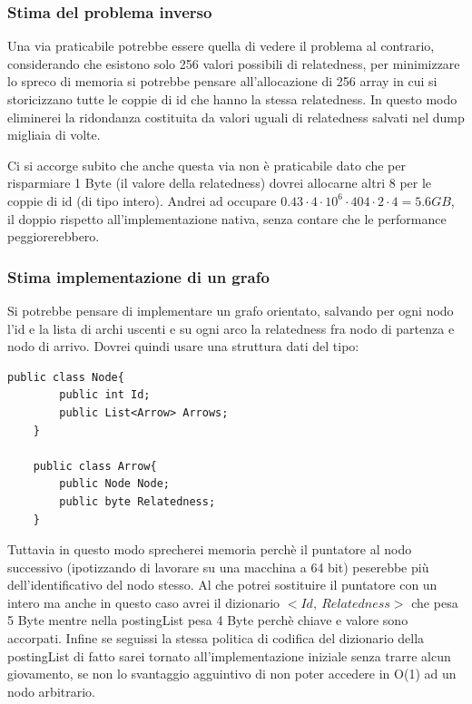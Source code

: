 \subsubsection{Stima del problema inverso}
Una via praticabile potrebbe essere quella di vedere il problema al contrario, considerando che esistono solo 256 valori possibili di relatedness, 
per minimizzare lo spreco di memoria si potrebbe pensare all'allocazione di 256 array in cui si storicizzano tutte le coppie di id che hanno la stessa relatedness. 
In questo modo eliminerei la ridondanza costituita da valori uguali di relatedness salvati nel dump migliaia di volte.

Ci si accorge subito che anche questa via non è praticabile dato che per risparmiare 1 Byte (il valore della relatedness) dovrei allocarne altri 8 per le coppie di id (di tipo intero). 
Andrei ad occupare $0.43 \cdot 4 \cdot 10^6 \cdot 404 \cdot 2 \cdot 4 = 5.6 GB$, il doppio rispetto all'implementazione nativa, senza contare che 
le performance peggiorerebbero.

\subsubsection{Stima implementazione di un grafo}
Si potrebbe pensare di implementare un grafo orientato, salvando per ogni nodo l'id e la lista di archi uscenti e su ogni arco la relatedness fra nodo di partenza 
e nodo di arrivo. Dovrei quindi usare una struttura dati del tipo:
 
\begin{lstlisting}[style=JavaStyle, caption=Struttura di un possibile grafo]
    public class Node{
        public int Id;
        public List<Arrow> Arrows;  
    }

    public class Arrow{
        public Node Node;
        public byte Relatedness;
    }
\end{lstlisting}

Tuttavia in questo modo sprecherei memoria perchè il puntatore al nodo successivo (ipotizzando di lavorare su una macchina a 64 bit) peserebbe più dell'identificativo 
del nodo stesso. Al che potrei sostituire il puntatore con un intero ma anche in questo caso avrei il dizionario $< Id,\ Relatedness >$ che pesa 5 Byte mentre nella 
postingList pesa 4 Byte perchè chiave e valore sono accorpati. Infine se seguissi la stessa politica di codifica del dizionario della postingList 
di fatto sarei tornato all'implementazione iniziale senza trarre alcun giovamento, se non lo svantaggio agguintivo di non poter accedere in O(1) ad un nodo arbitrario. 

